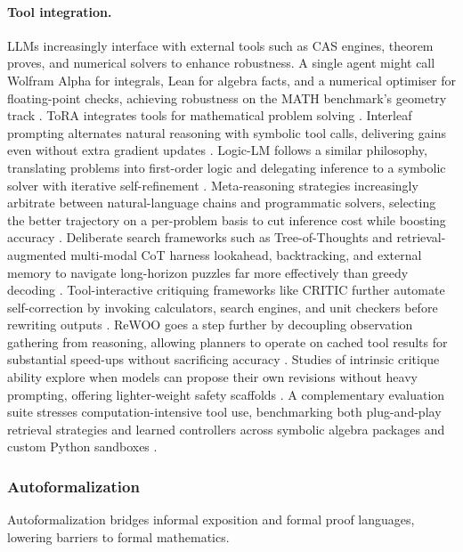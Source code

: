 \documentclass[acmsmall,anonymous]{acmart}
\begin{document}
\paragraph{Tool integration.}
LLMs increasingly interface with external tools such as CAS engines, theorem proves, and numerical solvers to enhance robustness.  A single agent might call Wolfram Alpha for integrals, Lean for algebra facts, and a numerical optimiser for floating-point checks, achieving robustness on the MATH benchmark’s geometry track \cite{frieder2023mathematical}. ToRA integrates tools for mathematical problem solving \cite{gou2023}.  Interleaf prompting alternates natural reasoning with symbolic tool calls, delivering gains even without extra gradient updates \cite{chen-2023-interleaf}.  Logic-LM follows a similar philosophy, translating problems into first-order logic and delegating inference to a symbolic solver with iterative self-refinement \cite{pan-2023-logiclm}.  Meta-reasoning strategies increasingly arbitrate between natural-language chains and programmatic solvers, selecting the better trajectory on a per-problem basis to cut inference cost while boosting accuracy \cite{zhao-2023-auto-model-selection}.  Deliberate search frameworks such as Tree-of-Thoughts and retrieval-augmented multi-modal CoT harness lookahead, backtracking, and external memory to navigate long-horizon puzzles far more effectively than greedy decoding \cite{yao-2023-tree-of-thoughts,liu-2024-ramcot}.  Tool-interactive critiquing frameworks like CRITIC further automate self-correction by invoking calculators, search engines, and unit checkers before rewriting outputs \cite{gou2024criticlargelanguagemodels}.  ReWOO goes a step further by decoupling observation gathering from reasoning, allowing planners to operate on cached tool results for substantial speed-ups without sacrificing accuracy \cite{xu2023rewoodecouplingreasoningobservations}.  Studies of intrinsic critique ability explore when models can propose their own revisions without heavy prompting, offering lighter-weight safety scaffolds \cite{luo2023critiqueabilitylargelanguage}.  A complementary evaluation suite stresses computation-intensive tool use, benchmarking both plug-and-play retrieval strategies and learned controllers across symbolic algebra packages and custom Python sandboxes \cite{zhang-2023-tool-aug}.

\subsubsection{Autoformalization}\label{sec:autoformal}
Autoformalization bridges informal exposition and formal proof languages, lowering barriers to formal mathematics.
\end{document}
